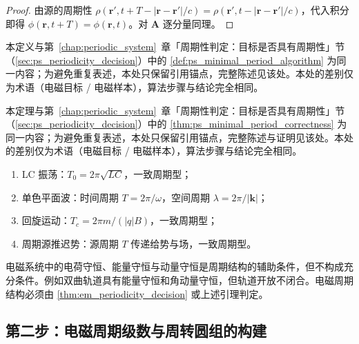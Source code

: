 \begin{proof}
由源的周期性 $\rho(\mathbf r',t+T-|\mathbf r-\mathbf r'|/c)=\rho(\mathbf r',t-|\mathbf r-\mathbf r'|/c)$，代入积分即得 $\phi(\mathbf r,t+T)=\phi(\mathbf r,t)$。对 $\mathbf A$ 逐分量同理。
\end{proof}

\begin{definition}[电磁最小正周期算法]\label{def:em_minimal_period_algorithm}
本定义与第~\ref{chap:periodic_system}~章「周期性判定：目标是否具有周期性」节（\cref{sec:ps_periodicity_decision}）中的 \cref{def:ps_minimal_period_algorithm} 为同一内容；为避免重复表述，本处只保留引用锚点，完整陈述见该处。本处的差别仅为术语（电磁目标 / 电磁样本），算法步骤与结论完全相同。
\end{definition}

\begin{theorem}[电磁最小正周期算法的正确性]\label{thm:em_minimal_period_correctness}
本定理与第~\ref{chap:periodic_system}~章「周期性判定：目标是否具有周期性」节（\cref{sec:ps_periodicity_decision}）中的 \cref{thm:ps_minimal_period_correctness} 为同一内容；为避免重复表述，本处只保留引用锚点，完整陈述与证明见该处。本处的差别仅为术语（电磁目标 / 电磁样本），算法步骤与结论完全相同。
\end{theorem}

\begin{example}[电磁周期判定实例]\label{ex:em_periodic_examples}
\begin{enumerate}[label=(\roman*)]
    \item LC 振荡：$T_0=2\pi\sqrt{LC}$，一致周期型；
    \item 单色平面波：时间周期 $T=2\pi/\omega$，空间周期 $\lambda=2\pi/|\mathbf k|$；
    \item 回旋运动：$T_c=2\pi m/(|q|B)$，一致周期型；
    \item 周期源推迟势：源周期 $T$ 传递给势与场，一致周期型。
\end{enumerate}
\end{example}

\begin{remark}[守恒量不保证周期]\label{rem:em_invariant_not_period}
电磁系统中的电荷守恒、能量守恒与动量守恒是周期结构的辅助条件，但不构成充分条件。例如双曲轨道具有能量守恒和角动量守恒，但轨道开放不闭合。电磁周期结构必须由 \cref{thm:em_periodicity_decision} 或上述引理判定。
\end{remark}

\subsection{第二步：电磁周期级数与周转圆组的构建}

